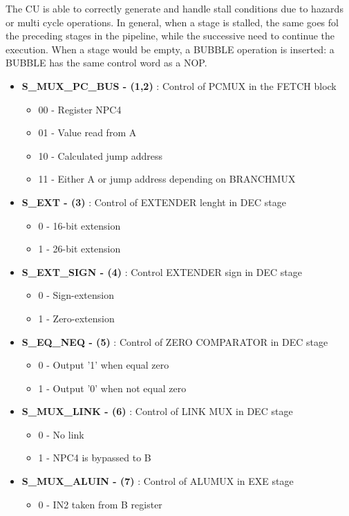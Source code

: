 \documentclass[12pt]{article}
\begin{document}
The CU is able to correctly generate and handle stall conditions due to hazards or multi cycle operations. In general, when a stage is stalled, the same goes fol the preceding stages in the pipeline, while the successive need to continue the execution. When a stage would be empty, a BUBBLE operation is inserted: a BUBBLE has the same control word as a NOP.
\begin{itemize}
	\item \textbf{S\_MUX\_PC\_BUS - (1,2)} : Control of PCMUX in the FETCH block
	\begin{itemize}
		\item 00 - Register NPC4 
		\item 01 - Value read from A
		\item 10 - Calculated jump address
		\item 11 - Either A or jump address depending on BRANCHMUX
	\end{itemize}
	\item \textbf{S\_EXT - (3)} : Control of EXTENDER lenght in DEC stage
	\begin{itemize}
		\item 0 - 16-bit extension
		\item 1 - 26-bit extension
	\end{itemize}
	\item \textbf{S\_EXT\_SIGN - (4)} : Control EXTENDER sign in DEC stage
	\begin{itemize}
		\item 0 - Sign-extension 
		\item 1 - Zero-extension
	\end{itemize}
	\item \textbf{S\_EQ\_NEQ - (5)} : Control of ZERO COMPARATOR in DEC stage
	\begin{itemize}
		\item 0 - Output '1' when equal zero 
		\item 1 - Output '0' when not equal zero
	\end{itemize}
	\item \textbf{S\_MUX\_LINK - (6)} : Control of LINK MUX in DEC stage
	\begin{itemize}
		\item 0 - No link 
		\item 1 - NPC4 is bypassed to B
	\end{itemize}
	\item \textbf{S\_MUX\_ALUIN - (7)} : Control of ALUMUX in EXE stage
	\begin{itemize}
		\item 0 - IN2 taken from B register

\end{itemize}
\end{itemize}
\end{document}
